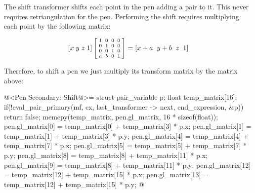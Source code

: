 The shift transformer shifts each point in the pen adding a pair to
it. This never requires retriangulation for the pen. Performing the
shift requires multiplying each point by the following matrix:

$$\left[x\; y\; z\; 1\right]\left[{{1 \atop 0}\atop {0\atop
      a}}{{0 \atop 1}\atop {0 \atop b}}{{0\atop 0}\atop{1 \atop
      0}}{{0 \atop 0}\atop{0\atop 1}}\right]=\left[x+a \;\; y+b\;\;
      z\;\; 1\right]
$$

Therefore, to shift a pen we just multiply its transform matrix by the
matrix above:

\iniciocodigo
@<Pen Secondary: Shift@>=
struct pair_variable p;
float temp_matrix[16];
if(!eval_pair_primary(mf, cx, last_transformer -> next, end_expression, &p))
  return false;
memcpy(temp_matrix, pen.gl_matrix, 16 * sizeof(float));
pen.gl_matrix[0] = temp_matrix[0] + temp_matrix[3] * p.x;
pen.gl_matrix[1] = temp_matrix[1] + temp_matrix[3] * p.y;
pen.gl_matrix[4] = temp_matrix[4] + temp_matrix[7] * p.x;
pen.gl_matrix[5] = temp_matrix[5] + temp_matrix[7] * p.y;
pen.gl_matrix[8] = temp_matrix[8] + temp_matrix[11] * p.x;
pen.gl_matrix[9] = temp_matrix[8] + temp_matrix[11] * p.y;
pen.gl_matrix[12] = temp_matrix[12] + temp_matrix[15] * p.x;
pen.gl_matrix[13] = temp_matrix[12] + temp_matrix[15] * p.y;
@
\fimcodigo









\fim

